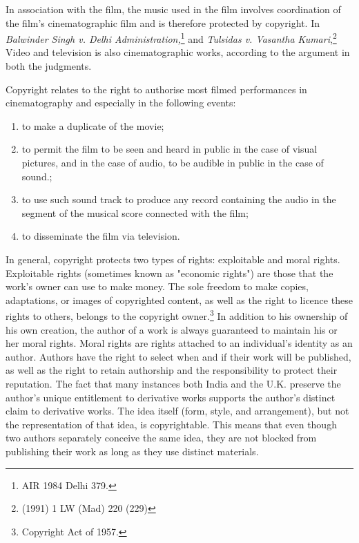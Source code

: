 \begin{multicols}{2}
\noi
In association with the film, the music used in the film involves coordination of the film's
cinematographic film and is therefore protected by copyright. In \textit{Balwinder Singh v. Delhi
Administration,}\footnote{AIR 1984 Delhi 379.} and \textit{Tulsidas v. Vasantha Kumari},\footnote{(1991) 1 LW (Mad) 220 (229)} Video and television is also
cinematographic works, according to the argument in both the judgments.

\vspace{-.1cm}

\noi
Copyright relates to the right to authorise most filmed performances in cinematography and
especially in the following events:

\begin{enumerate}[label=$\bullet$]
\itemsep=0pt
\item to make a duplicate of the movie;

\item to permit the film to be seen and heard in public in the case of visual pictures, and in
the case of audio, to be audible in public in the case of sound.;

\item to use such sound track to produce any record containing the audio in the segment of
the musical score connected with the film;

\item to disseminate the film via television.
\end{enumerate}

\vspace{-.2cm}

\noi
In general, copyright protects two types of rights: exploitable and moral rights. Exploitable
rights (sometimes known as "economic rights") are those that the work's owner can use to
make money. The sole freedom to make copies, adaptations, or images of copyrighted
content, as well as the right to licence these rights to others, belongs to the copyright owner.\footnote{Copyright Act of 1957.}
In addition to his ownership of his own creation, the author of a work is always guaranteed to
maintain his or her moral rights. Moral rights are rights attached to an individual's identity as
an author. Authors have the right to select when and if their work will be published, as well
as the right to retain authorship and the responsibility to protect their reputation. The fact that
many instances both India and the U.K. preserve the author's unique entitlement to derivative
works supports the author's distinct claim to derivative works. The idea itself (form, style,
and arrangement), but not the representation of that idea, is copyrightable. This means that
even though two authors separately conceive the same idea, they are not blocked from
publishing their work as long as they use distinct materials.


\end{multicols}
